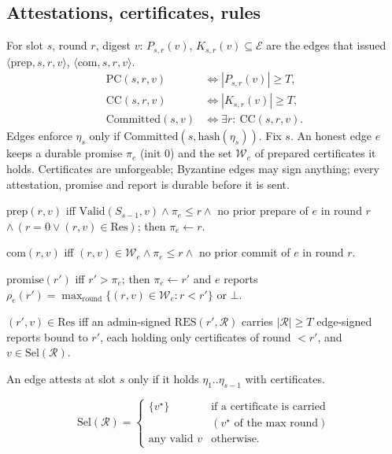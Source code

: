 \documentclass[conference]{IEEEtran}
\newcommand{\E}{\mathcal{E}}
\newcommand{\Pc}{\mathrm{PC}}
\newcommand{\Cc}{\mathrm{CC}}
\newcommand{\Val}{\mathrm{Valid}}
\newcommand{\Sel}{\mathrm{Sel}}
\newcommand{\Cm}{\mathrm{Committed}}
\newcommand{\W}{\mathcal{W}}
\begin{document}
\subsection{Attestations, certificates, rules}
For slot $s$, round $r$, digest $v$: $P_{s,r}(v)$, $K_{s,r}(v)\subseteq\E$ are the edges that issued $\langle\mathrm{prep},s,r,v\rangle$, $\langle\mathrm{com},s,r,v\rangle$.
\begin{align}
\Pc(s,r,v)&\Leftrightarrow |P_{s,r}(v)|\ge T,\\
\Cc(s,r,v)&\Leftrightarrow |K_{s,r}(v)|\ge T,\\
\Cm(s,v)&\Leftrightarrow \exists r:\ \Cc(s,r,v).
\end{align}
Edges enforce $\eta_s$ only if $\Cm(s,\mathrm{hash}(\eta_s))$. Fix $s$. An honest edge $e$ keeps a durable promise $\pi_e$ (init $0$) and the set $\W_e$ of prepared certificates it holds. Certificates are unforgeable; Byzantine edges may sign anything; every attestation, promise and report is durable before it is sent.
\begin{description}\itemsep0pt
\item[R1] $\mathrm{prep}(r,v)$ iff $\Val(S_{s-1},v)\wedge\pi_e\le r\wedge$ no prior prepare of $e$ in round $r$ $\wedge\,(r{=}0\vee(r,v)\in\mathrm{Res})$; then $\pi_e\leftarrow r$.
\item[R2] $\mathrm{com}(r,v)$ iff $(r,v)\in\W_e\wedge\pi_e\le r\wedge$ no prior commit of $e$ in round $r$.
\item[R3] $\mathrm{promise}(r')$ iff $r'>\pi_e$; then $\pi_e\leftarrow r'$ and $e$ reports $\rho_e(r')=\max_{\mathrm{round}}\{(r,v)\in\W_e:r<r'\}$ or $\bot$.
\item[R4] $(r',v)\in\mathrm{Res}$ iff an admin-signed $\mathrm{RES}(r',\mathcal R)$ carries $|\mathcal R|\ge T$ edge-signed reports bound to $r'$, each holding only certificates of round $<r'$, and $v\in\Sel(\mathcal R)$.
\item[A5] An edge attests at slot $s$ only if it holds $\eta_1..\eta_{s-1}$ with certificates.
\end{description}
\begin{equation}
\Sel(\mathcal R)=\begin{cases}\{v^\star\}&\text{if a certificate is carried}\\[-1pt]&(v^\star\text{ of the max round})\\ \text{any valid }v&\text{otherwise.}\end{cases}
\end{equation}
\end{document}
